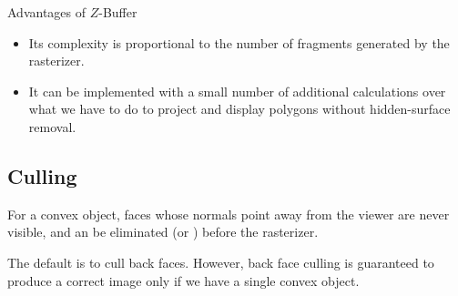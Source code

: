 \documentclass[../COS3712_Notes.tex]{subfiles}
\begin{document}
      \begin{sidenote}{Advantages of $Z$-Buffer}
        $ $\vspace{-1em}
        \begin{itemize}
          \item Its complexity is proportional to the number of fragments generated
            by the rasterizer.
          \item It can be implemented with a small number of additional calculations
            over what we have to do to project and display polygons without
            hidden-surface removal.
        \end{itemize}
      \end{sidenote}

      \subsection{Culling}
        For a convex object, faces whose normals point away from the viewer are never visible,
        and an be eliminated (or ) before the rasterizer.

        The default is to cull back faces.
        However, back face culling is guaranteed to produce a correct image only if we have
        a single convex object.
\end{document}
